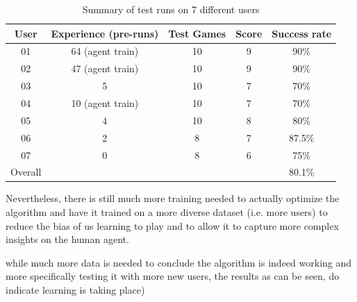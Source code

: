 \documentclass[a4paper,11pt]{article}
\begin{document}
\begin{table}[ht]
\begin{center}
\caption{Summary of test runs on 7 different users}
\label{tbl:tests} 
\begin{tabular}{|c|c|c|c|c|} 
\hline

User & Experience (pre-runs) & Test Games & Score & Success rate \\
\hline
01 & 64 (agent train) & 10 & 9 &  90\%    \\ 
02 & 47 (agent train) & 10 & 9 &  90\%    \\
03 & 5                & 10 & 7 &  70\%    \\
04 & 10 (agent train) & 10 & 7 &  70\%    \\ 
05 & 4                & 10 & 8 &  80\%    \\
06 & 2                & 8  & 7 &  87.5\%  \\ 
07 & 0                & 8  & 6 &  75\%    \\

\hline

\multicolumn{1}{|c|}{Overall} & \multicolumn{3}{c|}{ } & \multicolumn{1}{c|}{80.1\%} \\
\hline
\end{tabular}
\end{center}
\end{table}


Nevertheless, there is still much more training needed to actually optimize the algorithm and have it trained on a more diverse dataset (i.e. more users) to reduce the bias of us learning to play and to allow it to capture more complex insights on the human agent.

while much more data is needed to conclude the algorithm is indeed working and more specifically testing it with more new users, the results as can be seen, do indicate learning is taking place) 
\end{document}
